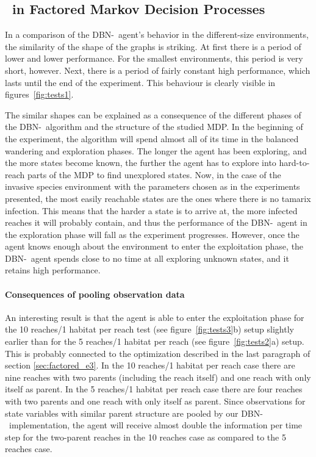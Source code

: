 \subsection{\etre\ in Factored Markov Decision Processes}
\label{sec:e3_factored_discussion}
In a comparison of the DBN-\etre\ agent's behavior in the different-size environments, the similarity of the shape of the graphs is striking. At first there is a period of lower and lower performance. For the smallest environments, this period is very short, however. Next, there is a period of fairly constant high performance, which lasts until the end of the experiment. This behaviour is clearly visible in figures~\ref{fig:tests1}.   

The similar shapes can be explained as a consequence of the different phases  of the DBN-\etre\ algorithm and the structure of the studied MDP. In the beginning of the experiment, the algorithm will spend almost all of its time in the balanced wandering and exploration phases. The longer the agent has been exploring, and the more states become known, the further the agent has to explore into hard-to-reach parts of the MDP to find unexplored states. Now, in the case of the invasive species environment with the parameters chosen as in the experiments presented, the most easily reachable states are the ones where there is no tamarix infection. This means that the harder a state is to arrive at, the more infected reaches it will probably contain, and thus the performance of the DBN-\etre\ agent in the exploration phase will fall as the experiment progresses. However, once the agent knows enough about the environment to enter the exploitation phase, the DBN-\etre\ agent spends close to no time at all exploring unknown states, and it retains high performance. 

\paragraph{Consequences of pooling observation data} An interesting result is that the agent is able to enter the exploitation phase for the 10 reaches/1 habitat per reach test (see figure~\ref{fig:tests3}b) setup slightly earlier than for the 5 reaches/1 habitat per reach (see figure~\ref{fig:tests2}a) setup. This is probably connected to the optimization described in the last paragraph of section \ref{sec:factored_e3}. In the 10 reaches/1 habitat per reach case there are nine reaches with two parents (including the reach itself) and one reach with only itself as parent. In the 5 reaches/1 habitat per reach case there are four reaches with two parents and one reach with only itself as parent. Since observations for state variables with similar parent structure are pooled by our DBN-\etre\ implementation, the agent will receive almost double the information per time step for the two-parent reaches in the 10 reaches case as compared to the 5 reaches case.  

